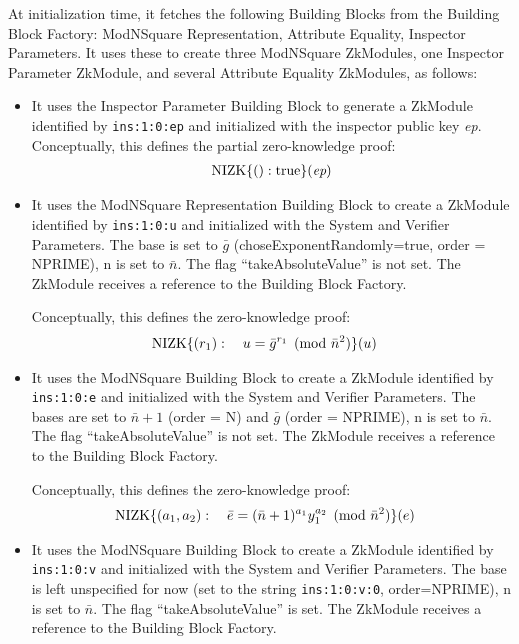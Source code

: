 \begin{itemize}
At initialization time, it fetches the following Building Blocks from the Building Block Factory:
ModNSquare Representation, Attribute Equality, Inspector Parameters. It uses these to create three ModNSquare ZkModules,
one Inspector Parameter ZkModule, and
several Attribute Equality ZkModules, as follows:

\begin{itemize}
\item It uses the Inspector Parameter Building Block to generate a ZkModule identified by \texttt{ins:1:0:ep} and initialized with the inspector public key \emph{ep}.
Conceptually, this defines the partial zero-knowledge proof:
\begin{align}
\label{eq:ex:verenc:first}
\operatorname{NIZK}\lbrace():\operatorname{true}\rbrace(\emph{ep})
\end{align}

\item It uses the ModNSquare Representation Building Block to create a ZkModule identified by \texttt{ins:1:0:u} and initialized
with the System and Verifier Parameters. The base is set to $\bar g$ (choseExponentRandomly=true, order = NPRIME),
n is set to $\bar n$.
The flag ``takeAbsoluteValue'' is not set.
The ZkModule receives a reference to the Building Block Factory.

Conceptually, this defines the zero-knowledge proof:
\begin{align}
\operatorname{NIZK}\lbrace(r_1): \quad u &= {\bar g}^{r_1} \pmod{\bar n^2} \rbrace(u)
\end{align}

\item It uses the ModNSquare Building Block to create a ZkModule identified by \texttt{ins:1:0:e} and initialized
with the System and Verifier Parameters. The bases are set to
$\bar n+1$ (order = N) and $\bar g$ (order = NPRIME),
n is set to $\bar n$.
The flag ``takeAbsoluteValue'' is not set.
The ZkModule receives a reference to the Building Block Factory.

Conceptually, this defines the zero-knowledge proof:
\begin{align}
\operatorname{NIZK}\lbrace(a_1, a_2): \quad
\bar e &= (\bar n+1)^{a_1} y_1^{a_2} \pmod{\bar n^2}
\rbrace(e)
\end{align}

\item It uses the ModNSquare Building Block to create a ZkModule identified by \texttt{ins:1:0:v} and initialized
with the System and Verifier Parameters. The base is
left unspecified for now (set to the string \texttt{ins:1:0:v:0}, order=NPRIME),
n is set to $\bar n$.
The flag ``takeAbsoluteValue'' is set.
The ZkModule receives a reference to the Building Block Factory.


\end{itemize}
\end{itemize}
